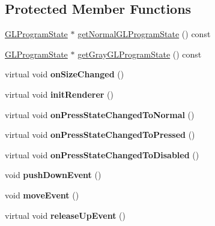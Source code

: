 \subsection*{Protected Member Functions}
\begin{DoxyCompactItemize}
\item 
\hyperlink{classGLProgramState}{G\+L\+Program\+State} $\ast$ \hyperlink{classui_1_1Widget_a2ad2ac71884305f41d5965158c2a44c5}{get\+Normal\+G\+L\+Program\+State} () const
\item 
\hyperlink{classGLProgramState}{G\+L\+Program\+State} $\ast$ \hyperlink{classui_1_1Widget_a8f0f3e1b049851b0d73fb2fdff904c24}{get\+Gray\+G\+L\+Program\+State} () const
\item 
\mbox{\label{classui_1_1Widget_ab9c7bbef4ddc7de190da1667811893f1}} 
virtual void {\bfseries on\+Size\+Changed} ()
\item 
\mbox{\label{classui_1_1Widget_a3babe36d3846d5aa7b73bd29ec28a9dd}} 
virtual void {\bfseries init\+Renderer} ()
\item 
\mbox{\label{classui_1_1Widget_a33fd613d81d66a8bcd39e92b90bb8b51}} 
virtual void {\bfseries on\+Press\+State\+Changed\+To\+Normal} ()
\item 
\mbox{\label{classui_1_1Widget_a7cc8a6cd06cf5c75bf57f62eae1112f4}} 
virtual void {\bfseries on\+Press\+State\+Changed\+To\+Pressed} ()
\item 
\mbox{\label{classui_1_1Widget_ad1433fed579f970700c4d2ab243d2d1a}} 
virtual void {\bfseries on\+Press\+State\+Changed\+To\+Disabled} ()
\item 
\mbox{\label{classui_1_1Widget_a3bffd2be03976f329aafa4d0bae9adb6}} 
void {\bfseries push\+Down\+Event} ()
\item 
\mbox{\label{classui_1_1Widget_a1e2054502be048aa93dd2a866afa1052}} 
void {\bfseries move\+Event} ()
\item 
\mbox{\label{classui_1_1Widget_a55762e2eb887fb904b6460f9cbf1603f}} 
virtual void {\bfseries release\+Up\+Event} ()
\item 
\mbox{\label{classui_1_1Widget_aaf29ad3bfc722153f90ff553df11ea3b}} 

\end{DoxyCompactItemize}
